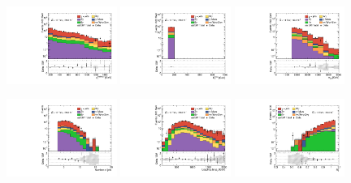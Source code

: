 \begin{figure}[ht!]
  \begin{center}

    \includegraphics[width=0.32\textwidth]{images_tmp/results/fr2/can_VRQ_ph_pt0_afterFit.pdf}
    \includegraphics[width=0.32\textwidth]{images_tmp/results/fr2/can_VRQ_met_et_afterFit.pdf}
    \includegraphics[width=0.32\textwidth]{images_tmp/results/fr2/can_VRQ_meff_afterFit.pdf}

    \includegraphics[width=0.32\textwidth]{images_tmp/results/fr2/can_VRQ_jet_n_afterFit}
    \includegraphics[width=0.32\textwidth]{images_tmp/results/fr2/can_VRQ_jet_pt0_afterFit.pdf}
    \includegraphics[width=0.32\textwidth]{images_tmp/results/fr2/can_VRQ_rt4_afterFit}


\end{center}
\end{figure}
